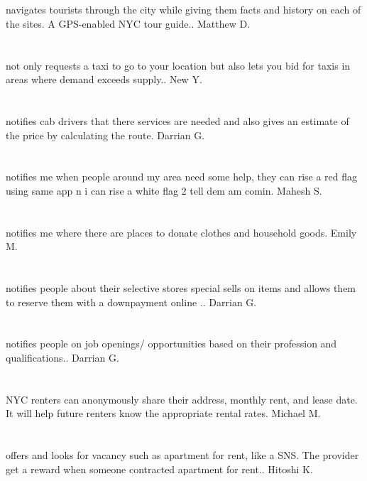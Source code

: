 \section{}navigates tourists through the city while giving them facts and history on each of the sites.  A GPS-enabled NYC tour guide.. Matthew D.
\section{}not only requests a taxi to go to your location but also lets you bid for taxis in areas where demand exceeds supply.. New Y.
\section{}notifies cab drivers that there services are needed and also gives an estimate of the price by calculating the route. Darrian G.
\section{}notifies me when people around my area need some help,  they can rise a red flag using same app n i can rise a white flag 2 tell dem am comin. Mahesh S.
\section{}notifies me where there are places to donate clothes and household goods. Emily M.
\section{}notifies people about their selective stores special sells on items and allows them to reserve them with a downpayment online .. Darrian G.
\section{}notifies people on job openings/ opportunities based on their profession and qualifications.. Darrian G.
\section{}NYC renters can anonymously share their address,  monthly rent,  and lease date. It will help future renters know the appropriate rental rates. Michael M.
\section{}offers and looks for vacancy such as apartment for rent,  like a SNS. The provider get a reward when someone contracted apartment for rent.. Hitoshi K.
